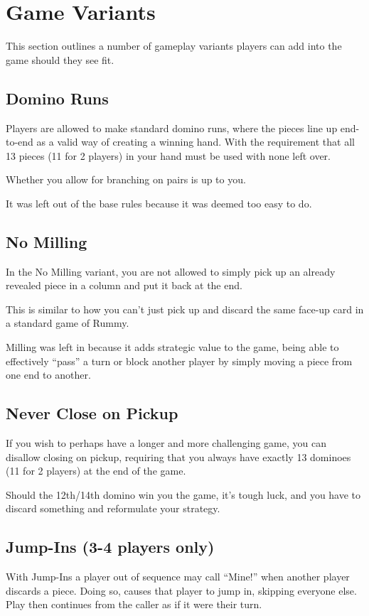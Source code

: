 \section{Game Variants}\label{sec:variants}
This section outlines a number of gameplay variants players can add into the game should they see fit.
\subsection{Domino Runs}
Players are allowed to make standard domino runs, where the pieces line up end-to-end as a valid way of creating a winning hand. With the requirement that all 13 pieces (11 for 2 players) in your hand must be used with none left over.

Whether you allow for branching on pairs is up to you.

\aside It was left out of the base rules because it was deemed too easy to do.

\subsection{No Milling}
In the No Milling variant, you are not allowed to simply pick up an already revealed piece in a column and put it back at the end.

This is similar to how you can't just pick up and discard the same face-up card in a standard game of Rummy.

\aside Milling was left in because it adds strategic value to the game, being able to effectively ``pass'' a turn or block another player by simply moving a piece from one end to another.

\subsection{Never Close on Pickup}
If you wish to perhaps have a longer and more challenging game, you can disallow closing on pickup, requiring that you always have exactly 13 dominoes (11 for 2 players) at the end of the game.

Should the 12th/14th domino win you the game, it's tough luck, and you have to discard something and reformulate your strategy.

\subsection{Jump-Ins (3-4 players only)}
With Jump-Ins a player out of sequence may call ``Mine!'' when another player discards a piece. Doing so, causes that player to jump in, skipping everyone else.
Play then continues from the caller as if it were their turn.

